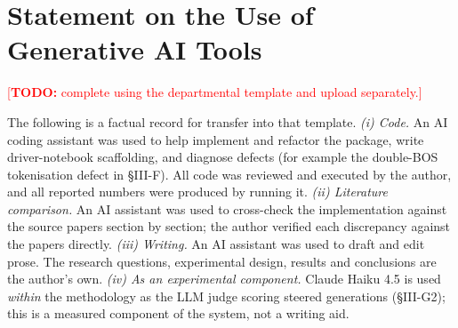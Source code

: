 \documentclass[conference]{IEEEtran}
\newcommand{\TODO}[1]{\textcolor{red}{[\textbf{TODO:} #1]}}
\begin{document}
\section{Statement on the Use of Generative AI Tools}
\TODO{complete using the departmental template and upload separately.}

The following is a factual record for transfer into that template.
\emph{(i) Code.} An AI coding assistant was used to help implement and refactor the package, write
driver-notebook scaffolding, and diagnose defects (for example the double-BOS tokenisation defect in
§III-F). All code was reviewed and executed by the author, and all reported numbers were produced by
running it.
\emph{(ii) Literature comparison.} An AI assistant was used to cross-check the implementation against
the source papers section by section; the author verified each discrepancy against the papers
directly.
\emph{(iii) Writing.} An AI assistant was used to draft and edit prose. The research questions,
experimental design, results and conclusions are the author's own.
\emph{(iv) As an experimental component.} Claude Haiku 4.5 is used \emph{within} the methodology as
the LLM judge scoring steered generations (§III-G2); this is a measured component of the system, not a
writing aid.
\end{document}

